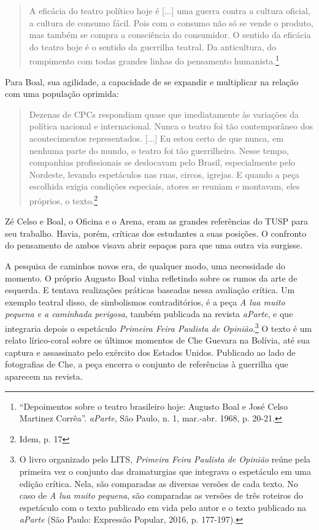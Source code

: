 \begin{quote}
A eficácia do teatro político hoje é {[}...{]} uma guerra contra a
cultura oficial, a cultura de consumo fácil. Pois com o consumo não só
se vende o produto, mas também se compra a consciência do consumidor. O
sentido da eficácia do teatro hoje é o sentido da guerrilha teatral. Da
anticultura, do rompimento com todas grandes linhas do pensamento
humanista.\footnote{“Depoimentos sobre o teatro brasileiro hoje: Augusto
  Boal e José Celso Martinez Corrêa”. \textit{aParte}, São Paulo, n. 1,
  mar.-abr. 1968, p. 20-21.}
\end{quote}

Para Boal, sua agilidade, a capacidade de se expandir e multiplicar na
relação com uma população oprimida:

\begin{quote}
Dezenas de CPCs respondiam quase que imediatamente às variações da
política nacional e internacional. Nunca o teatro foi tão contemporâneo
dos acontecimentos representados. {[}...{]} Eu estou certo de que nunca,
em nenhuma parte do mundo, o teatro foi tão guerrilheiro. Nesse tempo,
companhias profissionais se deslocavam pelo Brasil, especialmente pelo
Nordeste, levando espetáculos nas ruas, circos, igrejas. E quando a peça
escolhida exigia condições especiais, atores se reuniam e montavam, eles
próprios, o texto.\footnote{Idem, p. 17}
\end{quote}

Zé Celso e Boal, o Oficina e o Arena, eram as grandes referências do
TUSP para seu trabalho. Havia, porém, críticas dos estudantes a suas
posições. O confronto do pensamento de ambos visava abrir espaços para
que uma outra via surgisse.

A pesquisa de caminhos novos era, de qualquer modo, uma necessidade do
momento. O próprio Augusto Boal vinha refletindo sobre os rumos da arte
de esquerda. E tentava realizações práticas baseadas nessa avaliação
crítica. Um exemplo teatral disso, de simbolismos contraditórios, é a
peça \textit{A lua muito pequena e a caminhada perigosa}, também publicada
na revista \textit{aParte}, e que integraria depois o espetáculo
\textit{Primeira Feira Paulista de Opinião}.\footnote{O livro organizado
  pelo LITS, \textit{Primeira Feira Paulista de Opinião} reúne pela
  primeira vez o conjunto das dramaturgias que integrava o espetáculo em
  uma edição crítica. Nela, são comparadas as diversas versões de cada
  texto. No caso de \textit{A lua muito pequena}, são comparadas as versões
  de três roteiros do espetáculo com o texto publicado em vida pelo
  autor e o texto publicado na \textit{aParte} (São Paulo: Expressão
  Popular, 2016, p. 177-197).} O texto é um relato lírico-coral sobre os
últimos momentos de Che Guevara na Bolívia, até sua captura e
assassinato pelo exército dos Estados Unidos. Publicado ao lado de
fotografias de Che, a peça encerra o conjunto de referências à guerrilha
que aparecem na revista.

